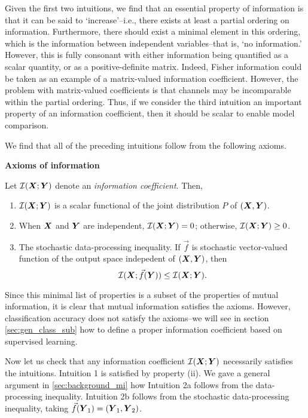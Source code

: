 \documentclass[12pt]{article}
\begin{document}
Given the first two intuitions, we find that an essential property of
information is that it can be said to `increase'--i.e., there exists
at least a partial ordering on information.  Furthermore, there should
exist a minimal element in this ordering, which is the information
between independent variables--that is, `no information.' However,
this is fully consonant with either information being quantified as a
scalar quantity, or as a positive-definite matrix.  Indeed, Fisher
information could be taken as an example of a matrix-valued
information coefficient.  However, the problem with matrix-valued
coefficients is that channels may be incomparable within the partial
ordering.  Thus, if we consider the third intuition an important
property of an information coefficient, then it should be scalar to
enable model comparison.

We find that all of the preceding intuitions follow from the following
axioms.

\noindent\textbf{Axioms of information}

Let $\mathcal{I}(\boldsymbol{X}; \boldsymbol{Y})$ denote an \emph{information coefficient}.
Then,
\begin{enumerate}
\item $\mathcal{I}(\boldsymbol{X}; \boldsymbol{Y})$ is a scalar functional of the joint distribution $P$ of $(\boldsymbol{X}, \boldsymbol{Y})$.
\item When $\boldsymbol{X}$ and $\boldsymbol{Y}$ are independent, $\mathcal{I}(\boldsymbol{X}; \boldsymbol{Y}) = 0$; otherwise, $\mathcal{I}(\boldsymbol{X}; \boldsymbol{Y}) \geq 0$.
\item 
The stochastic data-processing inequality.  If $\vec{f}$ is stochastic
vector-valued function of the output space indepedent of $(\boldsymbol{X}, \boldsymbol{Y})$,
then
\[
\mathcal{I}(\boldsymbol{X}; \vec{f}(\boldsymbol{Y})) \leq \mathcal{I}(\boldsymbol{X}; \boldsymbol{Y}).
\]
\end{enumerate}

Since this minimal list of properties is a subset of the properties of
mutual information, it is clear that mutual information satisfies the
axioms.  However, classification accuracy does not satisfy the
axioms--we will see in section \ref{sec:gen_class_sub} how to define
a proper information coefficient based on supervised learning.

Now let us check that any information coefficient
$\mathcal{I}(\boldsymbol{X}; \boldsymbol{Y})$ necessarily satisfies the intuitions.
Intuition 1 is satisfied by property (ii).  We gave a general argument
in \ref{sec:background_mi} how Intuition 2a follows from the
data-processing inequality.  Intuition 2b follows from the stochastic
data-processing inequality, taking $\vec{f}(\boldsymbol{Y}_1) = (\boldsymbol{Y}_1, \boldsymbol{Y}_2)$.
\end{document}
